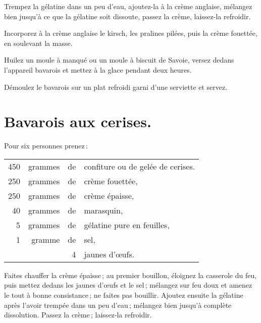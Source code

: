Trempez la gélatine dans un peu d'eau, ajoutez-la à la crème anglaise, mélangez
bien jusqu'à ce que la gélatine soit dissoute, passez la crème, laissez-la
refroidir.

Incorporez à la crème anglaise le kirsch, les pralines pilées, puis la crème
fouettée, en soulevant la masse.

Huilez un moule à manqué ou un moule à biscuit de Savoie, versez dedans
l'appareil bavarois et mettez à la glace pendant deux heures.

Démoulez le bavarois sur un plat refroidi garni d'une serviette et servez.

\section*{\centering Bavarois aux cerises.}
{}

Pour six personnes prenez :

\footnotesize
\begin{longtable}{rrrp{16em}}
    450 & grammes & de & confiture ou de gelée de cerises.                                                \\
    250 & grammes & de & crème fouettée,                                                                  \\
    250 & grammes & de & crème épaisse,                                                                   \\
     40 & grammes & de & marasquin,                                                                       \\
      5 & grammes & de & gélatine pure en feuilles,                                                       \\
      1 & gramme  & de & sel,                                                                             \\
        &         &  4 & jaunes d'œufs.                                                                   \\
\end{longtable}
\normalsize

Faites chauffer la crème épaisse ; au premier bouillon, éloignez la casserole
du feu, puis mettez dedans les jaunes d'œufs et le sel ; mélangez sur feu doux
et amenez le tout à bonne consistance ; ne faites pas bouillir. Ajoutez ensuite
la gélatine après l'avoir trempée dans un peu d'eau ; mélangez bien jusqu'à
complète dissolution. Passez la crème ; laissez-la refroidir.

